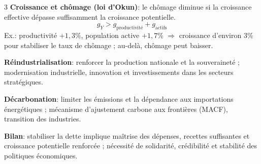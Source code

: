 \documentclass[12pt, a4paper]{article}
\begin{document}
\begin{multicols*}{3}
\textbf{Croissance et chômage (loi d'Okun)}: le chômage diminue si la croissance effective dépasse suffisamment la croissance potentielle.
\[
\boxed{g_Y>g_{\text{productivité}}+g_{\text{actifs}}}
\]
Ex.: productivité $+1,3\%$, population active $+1,7\%$ $\Rightarrow$ croissance d'environ $3\%$ pour stabiliser le taux de chômage ; au-delà, chômage peut baisser.

\textbf{Réindustrialisation}: renforcer la production nationale et la souveraineté ; modernisation industrielle, innovation et investissements dans les secteurs stratégiques.

\textbf{Décarbonation}: limiter les émissions et la dépendance aux importations énergétiques ; mécanisme d'ajustement carbone aux frontières (MACF), transition des industries.

\textbf{Bilan}: stabiliser la dette implique maîtrise des dépenses, recettes suffisantes et croissance potentielle renforcée ; nécessité de solidarité, crédibilité et stabilité des politiques économiques.

\end{multicols*}
\end{document}
